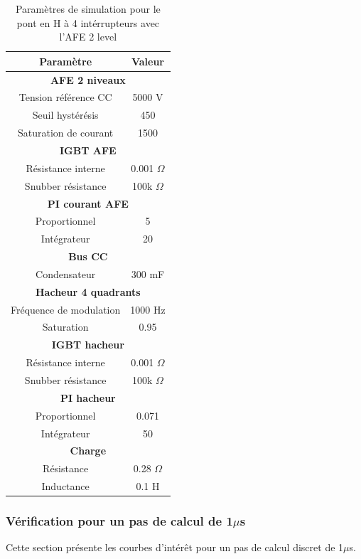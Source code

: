 \documentclass[11pt,letterpaper,final]{report}
\begin{document}
\begin{table}[htb]
\centering
\begin{tabular}{|c|c|} 
  \hline
  Paramètre & Valeur  \\
  \hline\hline \hline
  \multicolumn{2}{|c|}{\textbf{AFE 2 niveaux}}\\ \hline \hline 
  Tension référence CC & 5000 V\\ \hline
  Seuil hystérésis & 450\\ \hline
  Saturation de courant& 1500 \\ \hline \hline
  \multicolumn{2}{|c|}{\textbf{IGBT AFE}}\\ \hline
  Résistance interne & 0.001 $\Omega$\\
  Snubber résistance & 100k $\Omega$\\ \hline \hline
   \multicolumn{2}{|c|}{\textbf{PI courant AFE}}\\ \hline
  Proportionnel & 5 \\
  Intégrateur & 20 \\ \hline \hline
  \multicolumn{2}{|c|}{\textbf{Bus CC}}\\ \hline
  Condensateur & 300 mF\\
  \hline \hline \hline
  
  \multicolumn{2}{|c|}{\textbf{Hacheur 4 quadrants}}\\ \hline \hline
  Fréquence de modulation & 1000 Hz\\ \hline
  Saturation & 0.95 \\ \hline \hline
  \multicolumn{2}{|c|}{\textbf{IGBT hacheur}}\\ \hline
  Résistance interne & 0.001 $\Omega$\\
  Snubber résistance & 100k $\Omega$\\ \hline \hline
   \multicolumn{2}{|c|}{\textbf{PI hacheur}}\\ \hline
  Proportionnel & 0.071 \\
  Intégrateur & 50 \\ \hline \hline
  \multicolumn{2}{|c|}{\textbf{Charge}}\\ \hline
  Résistance & 0.28 $\Omega$\\
  Inductance & 0.1 H\\
  \hline
\end{tabular}
\caption{Paramètres de simulation pour le pont en H à 4 intérrupteurs avec l'AFE 2 level}
\label{p_AF_hash}
\end{table}

\subsubsection{Vérification pour un pas de calcul de 1$\mu$s}
Cette section présente les courbes d'intérêt pour un pas de calcul discret de 1$\mu$s. 
\end{document}
